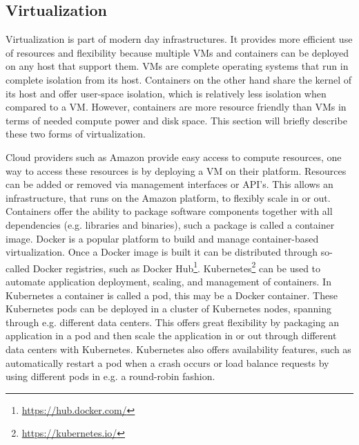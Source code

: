 \subsection{Virtualization}
\label{overview-virtualization}
Virtualization is part of modern day infrastructures. It provides more efficient use of resources and flexibility because multiple VMs and containers can be deployed on any host that support them. VMs are complete operating systems that run in complete isolation from its host. Containers on the other hand share the kernel of its host and offer user-space isolation, which is relatively less isolation when compared to a VM. However, containers are more resource friendly than VMs in terms of needed compute power and disk space. This section will briefly describe these two forms of virtualization.

Cloud providers such as Amazon provide easy access to compute resources, one way to access these resources is by deploying a VM on their platform. Resources can be added or removed via management interfaces or API's. This allows an infrastructure, that runs on the Amazon platform, to flexibly scale in or out. Containers offer the ability to package software components together with all dependencies (e.g. libraries and binaries), such a package is called a container image. Docker is a popular platform to build and manage container-based virtualization. Once a Docker image is built it can be distributed through so-called Docker registries, such as Docker Hub\footnote{\url{https://hub.docker.com/}}. Kubernetes\footnote{\url{https://kubernetes.io/}} can be used to automate application deployment, scaling, and management of containers. In Kubernetes a container is called a pod, this may be a Docker container. These Kubernetes pods can be deployed in a cluster of Kubernetes nodes, spanning through e.g. different data centers. This offers great flexibility by packaging an application in a pod and then scale the application in or out through different data centers with Kubernetes. Kubernetes also offers availability features, such as automatically restart a pod when a crash occurs or load balance requests by using different pods in e.g. a round-robin fashion.


